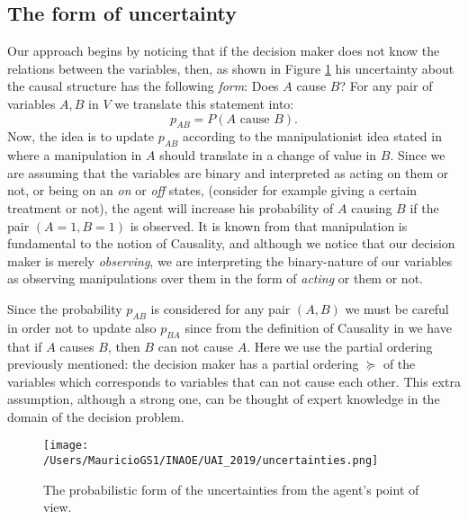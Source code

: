 \documentclass[letterpaper]{article}
\begin{document}
\subsection{The form of uncertainty}
Our approach begins by noticing that if the decision maker does not know the relations between the variables, then, as shown in Figure \ref{form_ofl} his uncertainty about the causal structure has the following \textit{form}: Does $A$ cause $B$? For any pair of variables $A,B$ in $V$ we translate this statement into:
\begin{equation}
p_{AB}=P(A \textrm{ cause } B).
\end{equation}
Now, the idea is to update $p_{AB}$ according to the manipulationist idea stated in \cite{woodward2005making} where a manipulation in $A$ should translate in a change of value in $B$. Since we are assuming that the variables are binary and interpreted as acting on them or not, or being on an \textit{on} or \textit{off} states, (consider for example giving a certain treatment or not), the agent will increase his probability of $A$ causing $B$ if the pair $(A=1,B=1)$ is observed. It is known from \cite{holland1985statistics} that manipulation is fundamental to the notion of Causality, and although we notice that our decision maker is merely \textit{observing}, we are interpreting the binary-nature of our variables as observing manipulations over them in the form of \textit{acting} or them or not. 

Since the probability $p_{AB}$ is considered for any pair $(A,B)$ we must be careful in order not to update also $p_{BA}$ since from the definition of Causality in \cite{spirtes2000causation} we have that if $A$ causes $B$, then $B$ can not cause $A$. Here we use the partial ordering previously mentioned: the decision maker has a partial ordering $\succeq$ of the variables which corresponds to variables that can not cause each other. This extra assumption, although a strong one, can be thought of expert knowledge in the domain of the decision problem. 

\begin{figure}[ht]
\vskip 0.2in
\begin{center}
\centerline{\texttt{[image: /Users/MauricioGS1/INAOE/UAI\_2019/uncertainties.png]}}
\caption{The probabilistic form of the uncertainties from the agent's point of view.}
\label{form_ofl}
\end{center}
\vskip -0.2in
\end{figure}
\end{document}
